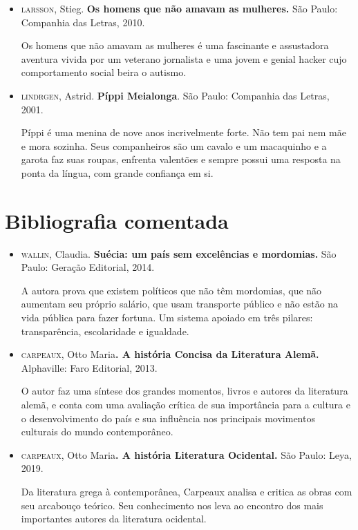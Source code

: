 \documentclass[12pt]{extarticle}
\begin{document}
\begin{itemize}
\item\textsc{larsson}, Stieg. \textbf{Os homens que não amavam as mulheres.} São
Paulo: Companhia das Letras, 2010.

Os homens que não amavam as mulheres é uma fascinante e assustadora
aventura vivida por um veterano jornalista e uma jovem e genial hacker
cujo comportamento social beira o autismo.

\item\textsc{lindrgen}, Astrid. \textbf{Píppi Meialonga}. São Paulo: Companhia das
Letras, 2001.

Píppi é uma menina de nove anos incrivelmente forte. Não tem pai nem mãe
e mora sozinha. Seus companheiros são um cavalo e um macaquinho e a
garota faz suas roupas, enfrenta valentões e sempre possui uma resposta
na ponta da língua, com grande confiança em si.
\end{itemize}

\section{Bibliografia comentada}

\begin{itemize}
\item\textsc{wallin}, Claudia. \textbf{Suécia: um país sem excelências e mordomias.}
São Paulo: Geração Editorial, 2014.

A autora prova que existem políticos que não têm mordomias, que não
aumentam seu próprio salário, que usam transporte público e não estão na
vida pública para fazer fortuna. Um sistema apoiado em três pilares:
transparência, escolaridade e igualdade.

\item\textsc{carpeaux}, Otto Maria\textbf{. A história Concisa da Literatura Alemã.}
Alphaville: Faro Editorial, 2013.

O autor faz uma síntese dos grandes momentos, livros e autores da
literatura alemã, e conta com uma avaliação crítica de sua importância
para a cultura e o desenvolvimento do país e sua influência nos
principais movimentos culturais do mundo contemporâneo.

\item\textsc{carpeaux}, Otto Maria\textbf{. A história Literatura Ocidental.} São
Paulo: Leya, 2019.

Da literatura grega à contemporânea, Carpeaux analisa e critica as obras
com seu arcabouço teórico. Seu conhecimento nos leva ao encontro dos
mais importantes autores da literatura ocidental.
\end{itemize}
\end{document}
